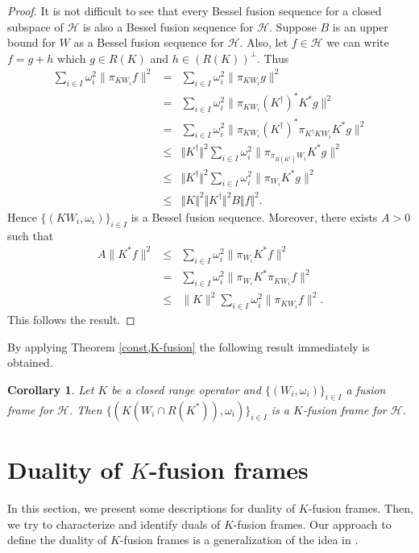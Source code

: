 \documentclass{birkjour}
\newtheorem{cor}[thm]{Corollary}
\theoremstyle{definition}
\theoremstyle{remark}
\numberwithin{equation}{section}
\begin{document}
\begin{proof}
It is not difficult to see that every Bessel fusion sequence for a closed subspace of $\mathcal{H}$ is also a Bessel fusion sequence for
$\mathcal{H}$. Suppose  $B$ is an upper bound for  $W$ as  a Bessel fusion sequence for
$\mathcal{H}$. Also, let $f\in \mathcal{H}$ we can write $f = g+h$ which $g\in R(K)$ and $h\in (R(K))^{\perp}$. Thus
\begin{eqnarray*}
\sum_{i\in I}\omega_i^2 \|\pi_{KW_i}f\|^2
&=&\sum_{i\in I}\omega_i^2 \|\pi_{KW_i}g\|^2\\
 &=& \sum_{i\in I}\omega_i^2 \|\pi_{KW_i}(K^{\dag})^{*}K^{*}g\|^2\\
&=& \sum_{i\in I}\omega_i^2 \|\pi_{KW_i}(K^{\dag})^{*}\pi_{K^{\dag}KW_{i}}K^{*}g\|^2\\
&\leq& \Vert K^{\dag}\Vert^{2} \sum_{i\in I}\omega_i^2 \|\pi_{\pi_{R(K^{\dag})}W_{i}}K^{*}g\|^2\\
&\leq&  \Vert K^{\dag}\Vert^{2} \sum_{i\in I}\omega_i^2 \|\pi_{W_i}K^{*}g\|^2\\
&\leq&    \Vert K\Vert^{2}  \Vert K^{\dag}\Vert^{2} B \Vert f\Vert^{2}.
\end{eqnarray*}
 Hence $\lbrace (KW_{i}, \omega_{i})\rbrace_{i\in
I}$ is a Bessel fusion sequence.
Moreover, there exists $A>0$ such that
\begin{eqnarray*}
A \|K^{*}f\|^{2} &\leq& \sum_{i\in I}\omega_i^2\|\pi_{W_i}K^{*}f\|^2\\
 &=&\sum_{i\in I}\omega_i^2\|\pi_{W_i}K^{*}\pi_{KW_i}f\|^2 \\
 &\leq& \|K\|^{2}\sum_{i\in I}\omega_i^2\|\pi_{KW_i}f\|^2.
 \end{eqnarray*}
 This follows the result.
\end{proof}
 By applying Theorem \ref{const,K-fusion} the following result immediately  is obtained.
\begin{cor}
Let  $K$ be a closed range operator and $\lbrace (W_{i}, \omega_{i})\rbrace_{i\in I}$
a  fusion frame for $\mathcal{H}$.
 Then $\lbrace (K(W_{i}\cap R(K^{*})), \omega_{i})\rbrace_{i\in
I}$ is a $K$-fusion frame for $\mathcal{H}$.
\end{cor}
\section{Duality of  $K$-fusion frames}


\smallskip
\goodbreak
In this section, we present some descriptions for duality of $K$-fusion frames. Then, we try to characterize and identify duals of $K$-fusion frames. Our approach to define the duality of $K$-fusion frames is a generalization of the  idea in \cite{Hei14}.
\end{document}
